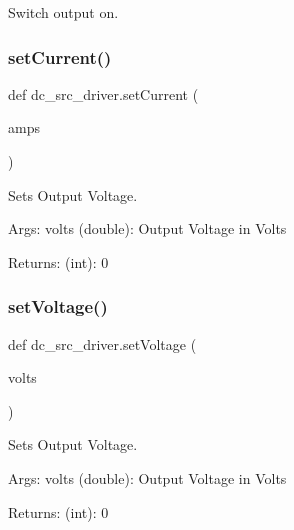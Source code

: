 \begin{DoxyVerb}Switch output on.
\end{DoxyVerb}
 \mbox{\label{namespacedc__src__driver_a46de53ee0b524cebc2ef80d30494490a}} 
\subsubsection{\texorpdfstring{set\+Current()}{setCurrent()}}
{\footnotesize\ttfamily def dc\+\_\+src\+\_\+driver.\+set\+Current (\begin{DoxyParamCaption}\item[{}]{amps }\end{DoxyParamCaption})}

\begin{DoxyVerb}Sets Output Voltage.
    
Args:
    volts (double): Output Voltage in Volts
    
Returns:
    (int): 0
\end{DoxyVerb}
 \mbox{\label{namespacedc__src__driver_a090e51c0489242cad54165afed01b7fb}} 
\subsubsection{\texorpdfstring{set\+Voltage()}{setVoltage()}}
{\footnotesize\ttfamily def dc\+\_\+src\+\_\+driver.\+set\+Voltage (\begin{DoxyParamCaption}\item[{}]{volts }\end{DoxyParamCaption})}

\begin{DoxyVerb}Sets Output Voltage.
    
Args:
    volts (double): Output Voltage in Volts
    
Returns:
    (int): 0
\end{DoxyVerb}
 